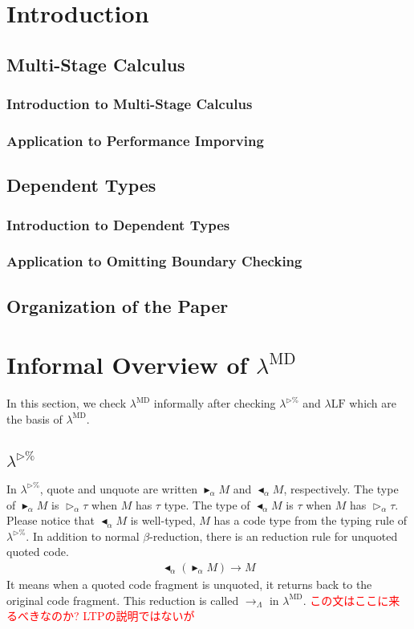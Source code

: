 \documentclass[runningheads]{llncs}
\newcommand{\red}[1]{\textcolor{red}{#1 }}
\newcommand{\LTP}{$\lambda^{\triangleright\%}$\xspace}
\newcommand{\LMD}{$\lambda^{\textrm{MD}}$\xspace}
\newcommand{\LLF}{$\lambda\textrm{LF}$\xspace}
\newcommand{\TW}{\triangleright}
\newcommand{\TB}{\blacktriangleright}
\newcommand{\TBL}{\blacktriangleleft}
\begin{document}
\section{Introduction}
\subsection{Multi-Stage Calculus}
\subsubsection{Introduction to Multi-Stage Calculus}
\subsubsection{Application to Performance Imporving}
\subsection{Dependent Types}
\subsubsection{Introduction to Dependent Types}
\subsubsection{Application to Omitting Boundary Checking}
\subsection{Organization of the Paper}

\section{Informal Overview of \LMD}

In this section, we check \LMD informally after checking \LTP and \LLF which are the basis of \LMD.

\subsection{\LTP}


In \LTP, quote and unquote are written $\TB_\alpha M$ and $\TBL_\alpha M$, respectively.
The type of $\TB_\alpha M$ is $\TW_\alpha \tau$ when $M$ has $\tau$ type.
The type of $\TBL_\alpha M$ is $\tau$ when $M$ has $\TW_\alpha \tau$.
Please notice that $\TBL_\alpha M$ is well-typed, $M$ has a code type from the typing rule of \LTP.
In addition to normal $\beta$-reduction, there is an reduction rule for unquoted quoted code.
\begin{align*}
	\TBL_\alpha (\TB_\alpha M) \longrightarrow M
\end{align*}
It means when a quoted code fragment is unquoted, it returns back to the original code fragment.
This reduction is called $\longrightarrow_\Lambda$ in \LMD.
\red{この文はここに来るべきなのか? LTPの説明ではないが}
\end{document}
